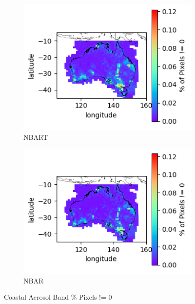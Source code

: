 \documentclass[a4paper]{article}
\begin{document}
      \begin{figure}[h!]
        \centering
          \begin{subfigure}[l]{.4\linewidth}
            \hspace{-32mm}
            \includegraphics[scale=0.9]{plots/nbart/nbart_coastal_aerosol-PercentDifferent.png}
            \caption{NBART}
          \end{subfigure}
%
          \begin{subfigure}[r]{.4\linewidth}
            \includegraphics[scale=0.9]{plots/nbar/nbar_coastal_aerosol-PercentDifferent.png}
            \caption{NBAR}
          \end{subfigure}
        \caption{Coastal Aerosol Band \% Pixels != 0}\label{figure:23}
      \end{figure}
\end{document}
